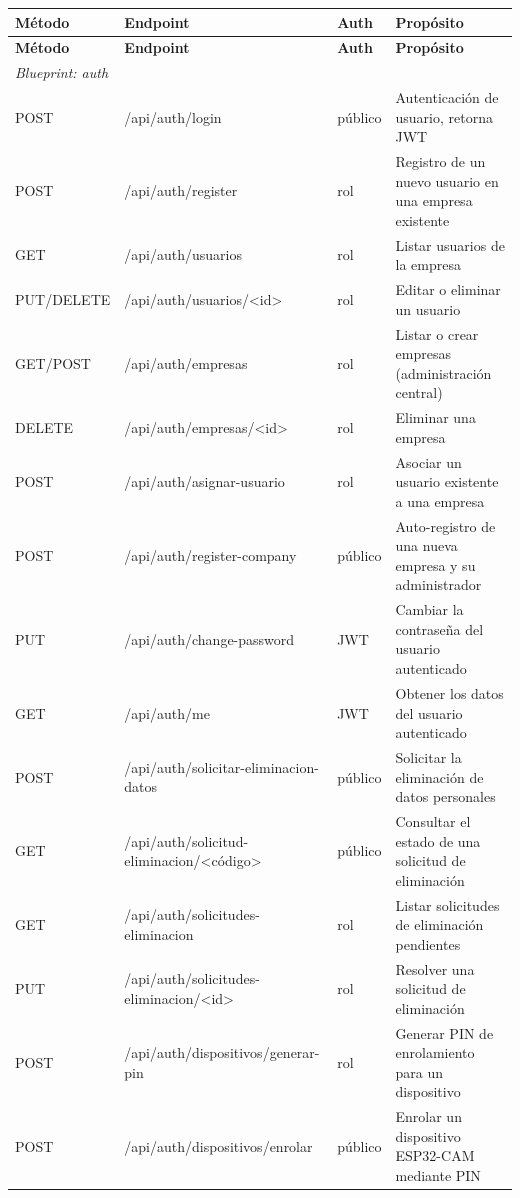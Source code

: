 \documentclass{iccmemoria}
\begin{document}
\small
\begin{longtable}{|p{1.5cm}|p{5.2cm}|p{1.2cm}|p{5.3cm}|}
\hline
\textbf{Método} & \textbf{Endpoint} & \textbf{Auth} & \textbf{Propósito} \\
\hline
\endfirsthead
\hline
\textbf{Método} & \textbf{Endpoint} & \textbf{Auth} & \textbf{Propósito} \\
\hline
\endhead

\multicolumn{4}{|l|}{\textit{Blueprint: auth}} \\
\hline
POST & /api/auth/login & público & Autenticación de usuario, retorna JWT \\
POST & /api/auth/register & rol & Registro de un nuevo usuario en una empresa existente \\
GET & /api/auth/usuarios & rol & Listar usuarios de la empresa \\
PUT/\allowbreak DELETE & /api/auth/usuarios/<id> & rol & Editar o eliminar un usuario \\
GET/\allowbreak POST & /api/auth/empresas & rol & Listar o crear empresas (administración central) \\
DELETE & /api/auth/empresas/<id> & rol & Eliminar una empresa \\
POST & /api/auth/asignar-usuario & rol & Asociar un usuario existente a una empresa \\
POST & /api/auth/register-company & público & Auto-registro de una nueva empresa y su administrador \\
PUT & /api/auth/change-password & JWT & Cambiar la contraseña del usuario autenticado \\
GET & /api/auth/me & JWT & Obtener los datos del usuario autenticado \\
POST & /api/\allowbreak auth/\allowbreak solicitar-eliminacion-datos & público & Solicitar la eliminación de datos personales \\
GET & /api/\allowbreak auth/\allowbreak solicitud-eliminacion/\allowbreak <código> & público & Consultar el estado de una solicitud de eliminación \\
GET & /api/\allowbreak auth/\allowbreak solicitudes-eliminacion & rol & Listar solicitudes de eliminación pendientes \\
PUT & /api/\allowbreak auth/\allowbreak solicitudes-eliminacion/\allowbreak <id> & rol & Resolver una solicitud de eliminación \\
POST & /api/\allowbreak auth/\allowbreak dispositivos/\allowbreak generar-pin & rol & Generar PIN de enrolamiento para un dispositivo \\
POST & /api/\allowbreak auth/\allowbreak dispositivos/\allowbreak enrolar & público & Enrolar un dispositivo ESP32-CAM mediante PIN \\
\hline


\end{longtable}
\end{document}
